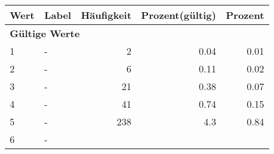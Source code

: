      \begin{longtable}{lXrrr}
     \toprule
     \textbf{Wert} & \textbf{Label} & \textbf{Häufigkeit} & \textbf{Prozent(gültig)} & \textbf{Prozent} \\
     \endhead
     \midrule
     \multicolumn{5}{l}{\textbf{Gültige Werte}}\\

     1 &
     \multicolumn{1}{X}{ -  } &


       \num{2} &
       \num[round-mode=places,round-precision=2]{0,04} &
         \num[round-mode=places,round-precision=2]{0,01} \\

     2 &
     \multicolumn{1}{X}{ -  } &


       \num{6} &
       \num[round-mode=places,round-precision=2]{0,11} &
         \num[round-mode=places,round-precision=2]{0,02} \\

     3 &
     \multicolumn{1}{X}{ -  } &


       \num{21} &
       \num[round-mode=places,round-precision=2]{0,38} &
         \num[round-mode=places,round-precision=2]{0,07} \\

     4 &
     \multicolumn{1}{X}{ -  } &


       \num{41} &
       \num[round-mode=places,round-precision=2]{0,74} &
         \num[round-mode=places,round-precision=2]{0,15} \\

     5 &
     \multicolumn{1}{X}{ -  } &


       \num{238} &
       \num[round-mode=places,round-precision=2]{4,3} &
         \num[round-mode=places,round-precision=2]{0,84} \\

     6 &
     \multicolumn{1}{X}{ -  } &



\end{longtable}
